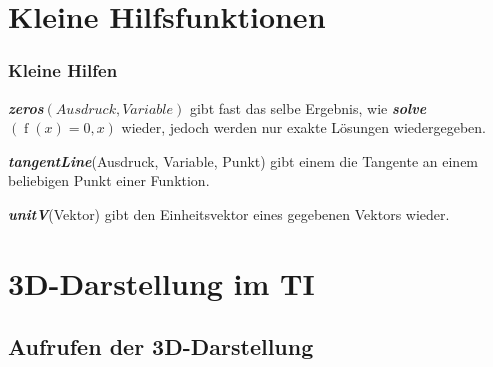 \documentclass[10pt,ngerman]{beamer}
\begin{document}
\section{Kleine Hilfsfunktionen}

\begin{frame}
	\frametitle{Kleine Hilfen}

	\textbf{\textit{zeros}}\((Ausdruck, Variable)\) gibt fast das selbe Ergebnis, wie \textbf{\textit{solve}}\((\operatorname{f}(x)=0, x)\) wieder, jedoch werden nur exakte Lösungen wiedergegeben. \newline

	\textbf{\textit{tangentLine}}(Ausdruck, Variable, Punkt) gibt einem die Tangente an einem beliebigen Punkt einer Funktion. \newline

	\textbf{\textit{unitV}}(Vektor) gibt den Einheitsvektor eines gegebenen Vektors wieder.

\end{frame}

\section{3D-Darstellung im TI}

\subsection{Aufrufen der 3D-Darstellung}
\end{document}
